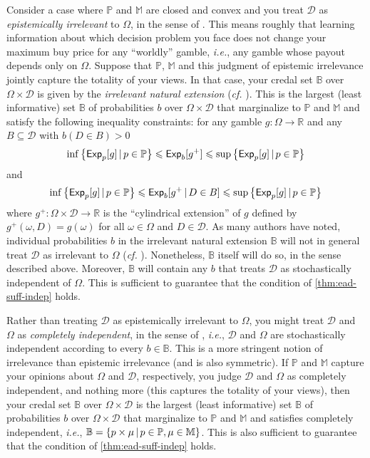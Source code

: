 \documentclass[a4paper]{article}
\newcommand\D{\mathcal{D}}
\renewcommand\P{\mathbb{P}} %
\newcommand\Exp{\mathsf{Exp}}
\newcommand{\IB}{\mathbb{B}}
\newcommand{\ID}{\mathbb{M}}
\newcommand{\IP}{\P}
\newcommand{\pb}{b}
\newcommand\SetDelimiter[1][]{
	\nonscript\,#1\vert \allowbreak \nonscript\,\mathopen{}}
\providecommand\given{\SetDelimiter}
\renewcommand{\leq}{\leqslant}
\newenvironment{CCM rewritten}
{\begingroup\color{blue}} %
{\endgroup}              %
\begin{document}
{Consider a case where $\IP$ and $\ID$ are closed and convex and you treat $\D$ as \textit{epistemically irrelevant} to $\Omega$, in the sense of \cite{walley1991srip}. This means roughly that learning information about which decision problem you face does not change your maximum buy price for any ``worldly'' gamble, \textit{i.e.}, any gamble whose payout depends only on $\Omega$. Suppose that $\IP$, $\ID$ and this judgment of epistemic irrelevance jointly capture the totality of your views. In that case, your credal set $\IB$ over $\Omega \times \D$ is given by the \textit{irrelevant natural extension} (\textit{cf.} \cite[Thm 13]{cooman2012}). This is the largest (least informative) set $\IB$ of probabilities $\pb$ over $\Omega \times \D$ that marginalize to $\IP$ and $\ID$ and satisfy the following inequality constraints: for any gamble $g:\Omega\rightarrow\mathbb{R}$ and any $B\subseteq\D$ with $b(D\in B)>0$
\[
\inf\left\{\Exp_p[g]\given p\in\IP\right\}\leq\Exp_b[g^+]\leq\sup\left\{\Exp_p[g]\given p\in\IP\right\}
\]
and
\[
\inf\left\{\Exp_p[g]\given p\in\IP\right\}\leq\Exp_b[g^+\given D\in B]\leq\sup\left\{\Exp_p[g]\given p\in\IP\right\}
\]
where $g^+:\Omega\times\D\rightarrow\mathbb{R}$ is the ``cylindrical extension'' of $g$ defined by $g^+(\omega,D)=g(\omega)$ for all $\omega\in\Omega$ and $D\in\D$. As many authors have noted, individual probabilities $\pb$ in the irrelevant natural extension $\IB$ will not in general treat $\D$ as irrelevant to $\Omega$ (\textit{cf.} \cite[pp. 96-7]{debock2019iar}). Nonetheless, $\IB$ itself will do so, in the sense described above. Moreover, $\IB$ will contain any $\pb$ that treats $\D$ as stochastically independent of $\Omega$. This is sufficient to guarantee that the condition of \cref{thm:ead-suff-indep} holds.

Rather than treating $\D$ as epistemically irrelevant to $\Omega$, you might treat $\D$ and $\Omega$ as \textit{completely independent}, in the sense of \cite{seidenfeld2007ci,cozman2012}, \textit{i.e.}, $\D$ and $\Omega$ are stochastically independent according to every $\pb\in\IB$. This is a more stringent notion of irrelevance than epistemic irrelevance (and is also symmetric). If $\IP$ and $\ID$ capture your opinions about $\Omega$ and $\D$, respectively, you judge $\D$ and $\Omega$ as completely independent, and nothing more (this captures the totality of your views), then your credal set $\IB$ over $\Omega \times \D$ is the largest (least informative) set $\IB$ of probabilities $\pb$ over $\Omega \times \D$ that marginalize to $\IP$ and $\ID$ and satisfies completely independent, \textit{i.e.}, $\IB=\left\{p\times\mu\given p\in\IP, \mu\in\ID\right\}$. This is also sufficient to guarantee that the condition of \cref{thm:ead-suff-indep} holds.}
\end{document}
